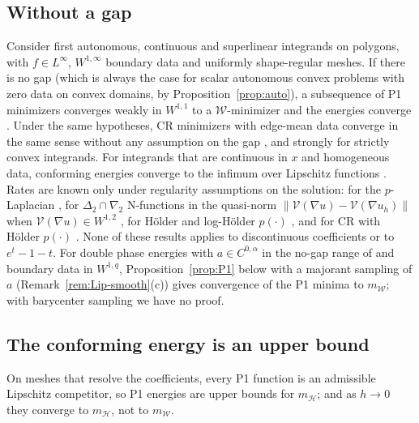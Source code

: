 \documentclass[11pt]{amsart}
\theoremstyle{definition}
\theoremstyle{remark}
\numberwithin{equation}{section}
\newcommand{\norm}[1]{\lVert #1\rVert}
\newcommand{\Wc}{\mathcal W}
\newcommand{\mW}{m_{\mathcal W}}
\newcommand{\mH}{m_{\mathcal H}}
\begin{document}
\subsection{Without a gap}\label{ssec:nogap}
Consider first autonomous, continuous and superlinear integrands on polygons, with $f\in L^\infty$, $W^{1,\infty}$ boundary data and uniformly shape-regular meshes. If there is no gap (which is always the case for scalar autonomous convex problems with zero data on convex domains, by Proposition~\ref{prop:auto}), a subsequence of P1 minimizers converges weakly in $W^{1,1}$ to a $\Wc$-minimizer and the energies converge \cite[Thm.~3.1]{Ortner2011}. Under the same hypotheses, CR minimizers with edge-mean data converge in the same sense without any assumption on the gap \cite[Thm.~4.1]{Ortner2011}, and strongly for strictly convex integrands. For integrands that are continuous in $x$ and homogeneous data, conforming energies converge to the infimum over Lipschitz functions \cite[Thm.~2.1]{CarstensenOrtner2010}. Rates are known only under regularity assumptions on the solution: for the $p$-Laplacian \cite{BarrettLiu1993,LiuBarrett1994,EbmeyerLiu2005}, for $\Delta_2\cap\nabla_2$ N-functions in the quasi-norm $\norm{\mathcal V(\nabla u)-\mathcal V(\nabla u_h)}$ when $\mathcal V(\nabla u)\in W^{1,2}$ \cite{DieningRuzicka2007,DieningKreuzer2008}, for H\"older and log-H\"older $p(\cdot)$ \cite{BreitDieningSchwarzacher2015,DelPezzoMartinez2015}, and for CR with H\"older $p(\cdot)$ \cite{BalciKaltenbach2023}. None of these results applies to discontinuous coefficients or to $e^t-1-t$. For double phase energies with $a\in C^{0,\alpha}$ in the no-gap range of \cite[Thm.~2.3]{BGS2022} and boundary data in $W^{1,q}$, Proposition~\ref{prop:P1} below with a majorant sampling of $a$ (Remark~\ref{rem:Lip-smooth}(c)) gives convergence of the P1 minima to $\mW$; with barycenter sampling we have no proof.

\subsection{The conforming energy is an upper bound}
On meshes that resolve the coefficients, every P1 function is an admissible Lipschitz competitor, so P1 energies are upper bounds for $\mH$; and as $h\to0$ they converge to $\mH$, not to $\mW$.
\end{document}
